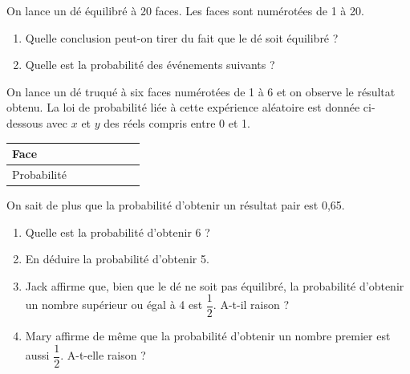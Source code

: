 \documentclass[a4paper,11pt,exos]{nsi} %
\begin{document}
On lance un dé équilibré à 20 faces. Les faces sont numérotées de 1 à 20.
\begin{enumerate}
	\item 	Quelle conclusion peut-on tirer du fait que le dé soit équilibré ?
	\item 	Quelle est la probabilité des événements suivants ?
\end{enumerate}


\exo{}
On lance un dé truqué à six faces numérotées de 1 à 6 et on observe le résultat obtenu. La loi de probabilité liée à cette expérience aléatoire est donnée ci-dessous avec $x$ et $y$ des réels compris entre 0 et 1.
\begin{center}
	\begin{tabular}{|l|p{1cm}|p{1cm}|p{1cm}|p{1cm}|p{1cm}|p{1cm}|}
		\hline
		\cellcolor{UGLiOrange}Face & \makebox[\linewidth][c]{1} & \makebox[\linewidth][c]{2} & \makebox[\linewidth][c]{3} & \makebox[\linewidth][c]{4} & \makebox[\linewidth][c]{5} & \makebox[\linewidth][c]{6}\\
		\hline
		\cellcolor{UGLiOrange}Probabilité & \makebox[\linewidth][c]{0,1} & \makebox[\linewidth][c]{0,35} & \makebox[\linewidth][c]{0,05} & \makebox[\linewidth][c]{0,2} & \makebox[\linewidth][c]{$x$} & \makebox[\linewidth][c]{$y$}\\
		\hline
	\end{tabular}
\end{center}


On sait de plus que la probabilité d'obtenir un résultat pair est 0,65.
\begin{enumerate}
	\item 	Quelle est la probabilité d'obtenir 6 ?
	\item 	En déduire la probabilité d'obtenir 5.
	\item	Jack affirme que, bien que le dé ne soit pas équilibré, la probabilité d'obtenir un nombre supérieur ou égal à 4 est $\dfrac{1}{2}$. A-t-il raison ?
	\item	Mary affirme de même que la probabilité d'obtenir un nombre premier est aussi $\dfrac{1}{2}$. A-t-elle raison ?
\end{enumerate}
\end{document}
